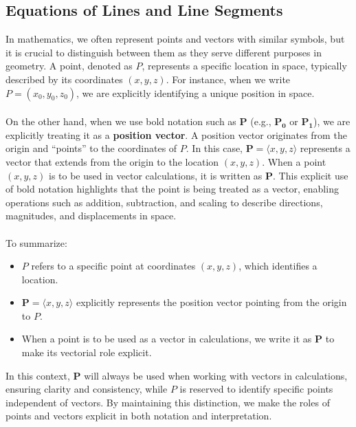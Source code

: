 \subsection*{Equations of Lines and Line Segments}

\noindent In mathematics, we often represent points and vectors with similar symbols, but it is crucial to distinguish between them as they serve different purposes in geometry. A point, denoted as \( P \), represents a specific location in space, typically described by its coordinates \( (x, y, z) \). For instance, when we write \( P = (x_0, y_0, z_0) \), we are explicitly identifying a unique position in space. \\ \\  On the other hand, when we use bold notation such as \( \mathbf{P} \) (e.g., \( \mathbf{P_0} \) or \( \mathbf{P_1} \)), we are explicitly treating it as a \textbf{position vector}. A position vector originates from the origin and ``points” to the coordinates of \( P \). In this case, \( \mathbf{P} = \langle x, y, z \rangle \) represents a vector that extends from the origin to the location \( (x, y, z) \).  When a point \( (x, y, z) \) is to be used in vector calculations, it is written as \( \mathbf{P} \). This explicit use of bold notation highlights that the point is being treated as a vector, enabling operations such as addition, subtraction, and scaling to describe directions, magnitudes, and displacements in space. \\ \\ To summarize:
\begin{itemize}
    \item \( P \) refers to a specific point at coordinates \( (x, y, z) \), which identifies a location.
    \item \( \mathbf{P} = \langle x, y, z \rangle \) explicitly represents the position vector pointing from the origin to \( P \).
    \item When a point is to be used as a vector in calculations, we write it as \( \mathbf{P} \) to make its vectorial role explicit.
\end{itemize}

\noindent In this context, \( \mathbf{P} \) will always be used when working with vectors in calculations, ensuring clarity and consistency, while \( P \) is reserved to identify specific points independent of vectors. By maintaining this distinction, we make the roles of points and vectors explicit in both notation and interpretation.


